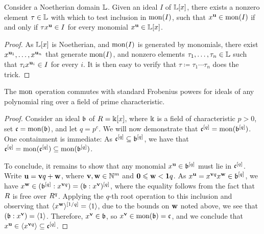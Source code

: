 \documentclass{article}
\begin{document}
\begin{lemma}
\label{single multiplier: L}
  Consider a Noetherian domain $\mathbb{L}$.  Given an ideal $I$ of $\mathbb{L}[x]$, there exists a nonzero element $\tau \in \mathbb{L}$ with which to test inclusion in $\operatorname{mon}(I)$, \ie such that $x^{\mathbf{u}} \in \operatorname{mon}(I)$ if and only if $\tau x^{\mathbf{u}} \in I$ for every monomial $x^{\mathbf{u}} \in \mathbb{L}[x]$.
\end{lemma}

\begin{proof}  As $\mathbb{L}[x]$ is Noetherian, and $\operatorname{mon}(I)$ is generated by monomials, there exist $x^{\mathbf{u}_1}, \ldots, x^{\mathbf{u}_n}$ that generate $\operatorname{mon}(I)$, and nonzero elements $\tau_1, \ldots, \tau_n \in \mathbb{L}$ such that $\tau_i x^{\mathbf{u}_i} \in I$ for every $i$.  It is then easy to verify that $\tau\coloneqq \tau_1 \cdots \tau_n$ does the trick.
\end{proof}

\begin{lemma} 
\label{frobenius-powers+mon-commute: L}
The $\operatorname{mon}$ operation commutes with standard Frobenius powers for ideals of any polynomial ring over a field of prime characteristic. %
\end{lemma}

\begin{proof}  Consider an ideal $\mathfrak{b}$ of $R=\Bbbk[x]$, where $\Bbbk$ is a field of characteristic $p>0$, set $\mathfrak{c} = \operatorname{mon}(\mathfrak{b})$, and let $q=p^e$.  We will now demonstrate that $\mathfrak{c}^{[q]} = \operatorname{mon}(\mathfrak{b}^{[q]})$.  One containment is immediate:   As $\mathfrak{c}^{[q]} \subseteq \mathfrak{b}^{[q]}$, we have that $\mathfrak{c}^{[q]} = \operatorname{mon}(\mathfrak{c}^{[q]}) \subseteq \operatorname{mon}(\mathfrak{b}^{[q]})$.
   
   To conclude, it remains to show that any monomial $x^{\mathbf{u}} \in \mathfrak{b}^{[q]}$ must lie in $\mathfrak{c}^{[q]}$.
   Write $\mathbf{u} = \mathbf{v}q + \mathbf{w}$, where $\mathbf{v}, \mathbf{w} \in \mathbb{N}^m$ and $\mathbf{0} \leqslant \mathbf{w} < \mathbf{1}q$.
   As $x^{\mathbf{u}} = x^{\mathbf{v}q} x^{\mathbf{w}} \in \mathfrak{b}^{[q]}$, we have $x^{\mathbf{w}} \in ( \mathfrak{b}^{[q]}: x^{\mathbf{v}q}) = (\mathfrak{b}:x^{\mathbf{v}})^{[q]}$, where the equality follows from the fact that $R$ is free over $R^q$.
   Applying the $q$-th root operation to this inclusion and observing that $\langle x^{\mathbf{w}} \rangle^{[1/q]} = \langle 1 \rangle$, due to the bounds on $\mathbf{w}$ noted above, we see that $ (\mathfrak{b}: x^{\mathbf{v}}) = \langle 1 \rangle$.
   Therefore, $x^{\mathbf{v}} \in \mathfrak{b}$, so $x^{\mathbf{v}} \in \operatorname{mon}(\mathfrak{b}) = \mathfrak{c}$, and we conclude that $x^{\mathbf{u}} \in \langle x^{\mathbf{v}q} \rangle \subseteq \mathfrak{c}^{[q]}$.
\end{proof}
\end{document}
